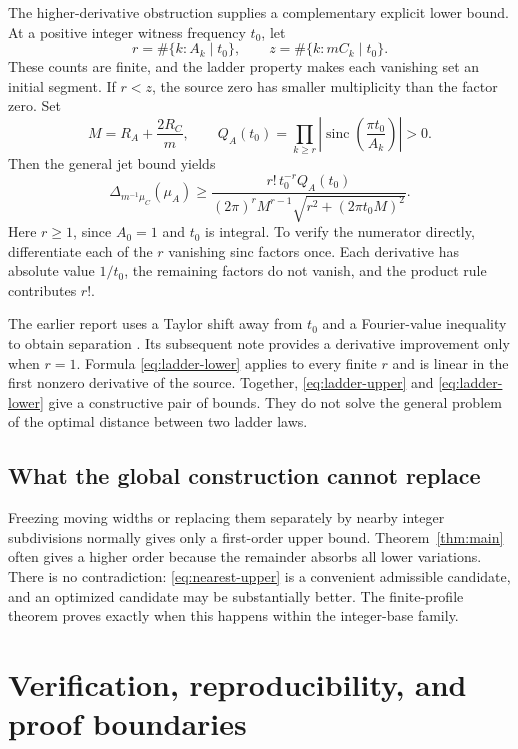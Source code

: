 \documentclass[11pt,letterpaper]{article}
\theoremstyle{definition}
\theoremstyle{remark}
\newcommand{\sinc}{\operatorname{sinc}}
\begin{document}
The higher-derivative obstruction supplies a complementary explicit lower bound. At a positive integer witness frequency $t_0$, let
\[
 r=\#\{k:A_k\mid t_0\},\qquad
 z=\#\{k:mC_k\mid t_0\}.
\]
These counts are finite, and the ladder property makes each vanishing set an initial segment. If $r<z$, the source zero has smaller multiplicity than the factor zero. Set
\[
 M=R_A+\frac{2R_C}{m},\qquad
 Q_A(t_0)=\prod_{k\ge r}\left|\sinc\left(\frac{\pi t_0}{A_k}\right)\right|>0.
\]
Then the general jet bound yields
\begin{equation}\label{eq:ladder-lower}
 \Delta_{m^{-1}\mu_C}(\mu_A)
 \ge\frac{r!\,t_0^{-r}Q_A(t_0)}
 {(2\pi)^rM^{r-1}\sqrt{r^2+(2\pi t_0M)^2}}.
\end{equation}
Here $r\ge1$, since $A_0=1$ and $t_0$ is integral. To verify the numerator directly, differentiate each of the $r$ vanishing sinc factors once. Each derivative has absolute value $1/t_0$, the remaining factors do not vanish, and the product rule contributes $r!$.

The earlier report uses a Taylor shift away from $t_0$ and a Fourier-value inequality to obtain separation \cite{repo-arithmetic}. Its subsequent note provides a derivative improvement only when $r=1$. Formula \eqref{eq:ladder-lower} applies to every finite $r$ and is linear in the first nonzero derivative of the source. Together, \eqref{eq:ladder-upper} and \eqref{eq:ladder-lower} give a constructive pair of bounds. They do not solve the general problem of the optimal distance between two ladder laws.

\subsection{What the global construction cannot replace}
Freezing moving widths or replacing them separately by nearby integer subdivisions normally gives only a first-order upper bound. Theorem~\ref{thm:main} often gives a higher order because the remainder absorbs all lower variations. There is no contradiction: \eqref{eq:nearest-upper} is a convenient admissible candidate, and an optimized candidate may be substantially better. The finite-profile theorem proves exactly when this happens within the integer-base family.


\section{Verification, reproducibility, and proof boundaries}\label{sec:verification}
\end{document}
